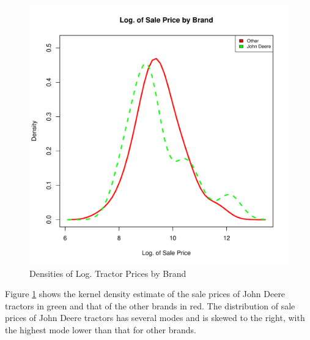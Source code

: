 \documentclass[11pt]{book}
\begin{document}
\begin{figure}[h!]
  \centering
  \includegraphics[scale = 0.5, keepaspectratio=true]{../Figures/dens_by_brand}
  \caption{Densities of Log. Tractor Prices by Brand} \label{fig:dens_by_brand}
\end{figure}


Figure \ref{fig:dens_by_brand} shows the
kernel density estimate of the sale prices of John Deere tractors
in green and that of the other brands in red.
%
The distribution of sale prices of John Deere tractors has several modes and is skewed to the right,
with the highest mode lower than that for other brands.



\end{document}
